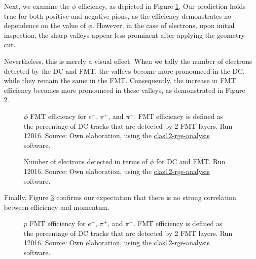     Next, we examine the $\phi$ efficiency, as depicted in Figure \ref{fig::14.14::fmt_efficiency_phi}.
    Our prediction holds true for both positive and negative pions, as the efficiency demonstrates no dependence on the value of $\phi$.
    However, in the case of electrons, upon initial inspection, the sharp valleys appear less prominent after applying the geometry cut.

    Nevertheless, this is merely a visual effect.
    When we tally the number of electrons detected by the DC and FMT, the valleys become more pronounced in the DC, while they remain the same in the FMT.
    Consequently, the increase in FMT efficiency becomes more pronounced in these valleys, as demonstrated in Figure \ref{fig::14.14::phi_geomcut}.

    \begin{figure}[t!]
        \centering{}
        \caption[$\phi$ FMT efficiency for $e^-$, $\pi^+$, and $\pi^-$.
        Run 12016]{$\phi$ FMT efficiency for $e^-$, $\pi^+$, and $\pi^-$.
        FMT efficiency is defined as the percentage of DC tracks that are detected by 2 FMT layers.
        Run 12016.
        Source: Own elaboration, using the \href{https://github.com/bleaktwig/clas12-rge-analysis}{clas12-rge-analysis} software.}
        \label{fig::14.14::fmt_efficiency_phi}
    \end{figure}

    \begin{figure}[t!]
        \centering{}
        \caption[Number of electrons detected in terms of $\phi$ for DC and FMT efficiencies for $e^-$.
        Run 12016]{Number of electrons detected in terms of $\phi$ for DC and FMT.
        Run 12016.
        Source: Own elaboration, using the \href{https://github.com/bleaktwig/clas12-rge-analysis}{clas12-rge-analysis} software.}
        \label{fig::14.14::phi_geomcut}
    \end{figure}

    Finally, Figure \ref{fig::14.14::fmt_efficiency_p} confirms our expectation that there is no strong correlation between efficiency and momentum.

    \begin{figure}[b!]
        \centering{}
        \caption[$p$ FMT efficiency for $e^-$, $\pi^+$, and $\pi^-$.
        Run 12016]{$p$ FMT efficiency for $e^-$, $\pi^+$, and $\pi^-$.
        FMT efficiency is defined as the percentage of DC tracks that are detected by 2 FMT layers.
        Run 12016.
        Source: Own elaboration, using the \href{https://github.com/bleaktwig/clas12-rge-analysis}{clas12-rge-analysis} software.}
        \label{fig::14.14::fmt_efficiency_p}
    \end{figure}
